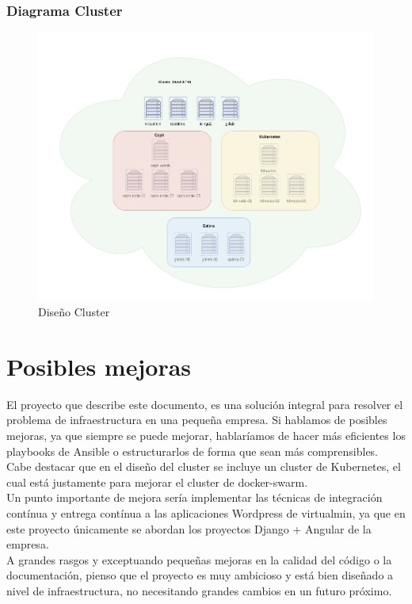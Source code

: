 \begin{paragraph}
		\subsubsection{Diagrama Cluster}
			\begin{figure}[!hbt]
				\centering
				\includegraphics[scale=0.39]{imagenes/Diseno/diagrama_cluster_2.png}
				\caption[Diseño Cluster]{Diseño Cluster} 
				\label{cluster_design}
			\end{figure}
		
	\end{paragraph}
		
\section{Posibles mejoras}
	\begin{paragraph}
		El proyecto que describe este documento, es una solución integral para resolver el problema de infraestructura en una pequeña empresa. Si hablamos de posibles mejoras, ya que siempre se puede mejorar, hablaríamos de hacer más eficientes los playbooks de Ansible o estructurarlos de forma que sean más comprensibles. Cabe destacar que en el diseño del cluster se incluye un cluster de Kubernetes, el cual está justamente para mejorar el cluster de docker-swarm. \\
		Un punto importante de mejora sería implementar las técnicas de integración contínua y entrega contínua a las aplicaciones Wordpress de virtualmin, ya que en este proyecto únicamente se abordan los proyectos Django + Angular de la empresa. \\
		A grandes rasgos y exceptuando pequeñas mejoras en la calidad del código o la documentación, pienso que el proyecto es muy ambicioso y está bien diseñado a nivel de infraestructura, no necesitando grandes cambios en un futuro próximo.
	\end{paragraph}